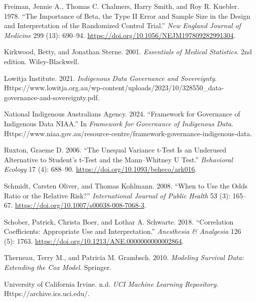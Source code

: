 \documentclass[
  a4paper,
]{memoir}
\newlength{\cslhangindent}
\newenvironment{CSLReferences}[2] %
 {\begin{list}{}{%
  \setlength{\itemindent}{0pt}
  \setlength{\leftmargin}{0pt}
  \setlength{\parsep}{0pt}
  \ifodd #1
   \setlength{\leftmargin}{\cslhangindent}
   \setlength{\itemindent}{-1\cslhangindent}
  \fi
  \setlength{\itemsep}{#2\baselineskip}}}
 {\end{list}}
\begin{document}
\begin{CSLReferences}{1}{1}
Freiman, Jennie A., Thomas C. Chalmers, Harry Smith, and Roy R. Kuebler.
1978. {``The {Importance} of {Beta}, the {Type II Error} and {Sample
Size} in the {Design} and {Interpretation} of the {Randomized Control
Trial}.''} \emph{New England Journal of Medicine} 299 (13): 690--94.
\url{https://doi.org/10.1056/NEJM197809282991304}.

Kirkwood, Betty, and Jonathan Sterne. 2001. \emph{Essentials of {Medical
Statistics}}. 2nd edition. Wiley-Blackwell.

Lowitja Institute. 2021. \emph{Indigenous {Data Governance} and
{Sovereignty}}.
Https://www.lowitja.org.au/wp-content/uploads/2023/10/328550\_data-governance-and-sovereignty.pdf.

National Indigenous Australians Agency. 2024. {``Framework for
{Governance} of {Indigenous Data} \textbar{} {NIAA}.''} In
\emph{Framework for Governance of Indigenous Data}.
Https://www.niaa.gov.au/resource-centre/framework-governance-indigenous-data.

Ruxton, Graeme D. 2006. {``The Unequal Variance t-Test Is an Underused
Alternative to {Student}'s t-Test and the {Mann}--{Whitney U} Test.''}
\emph{Behavioral Ecology} 17 (4): 688--90.
\url{https://doi.org/10.1093/beheco/ark016}.

Schmidt, Carsten Oliver, and Thomas Kohlmann. 2008. {``When to Use the
Odds Ratio or the Relative Risk?''} \emph{International Journal of
Public Health} 53 (3): 165--67.
\url{https://doi.org/10.1007/s00038-008-7068-3}.

Schober, Patrick, Christa Boer, and Lothar A. Schwarte. 2018.
{``Correlation {Coefficients}: {Appropriate Use} and
{Interpretation}.''} \emph{Anesthesia \& Analgesia} 126 (5): 1763.
\url{https://doi.org/10.1213/ANE.0000000000002864}.

Therneau, Terry M., and Patricia M. Grambsch. 2010. \emph{Modeling
{Survival Data}: {Extending} the {Cox Model}}. Springer.

University of California Irvine. n.d. \emph{{UCI Machine Learning
Repository}}. Https://archive.ics.uci.edu/.


\end{CSLReferences}
\end{document}
